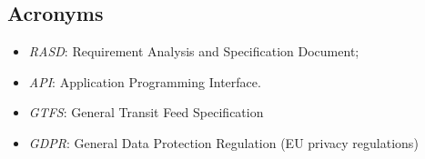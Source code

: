 \subsection{Acronyms}
	\begin{itemize}
	\item \textit{RASD}: Requirement Analysis and Specification Document;
	\item \textit{API}: Application Programming Interface.
	\item \textit{GTFS}: General Transit Feed Specification
	\item \textit{GDPR}: General Data Protection Regulation (EU privacy regulations)
	\end{itemize}